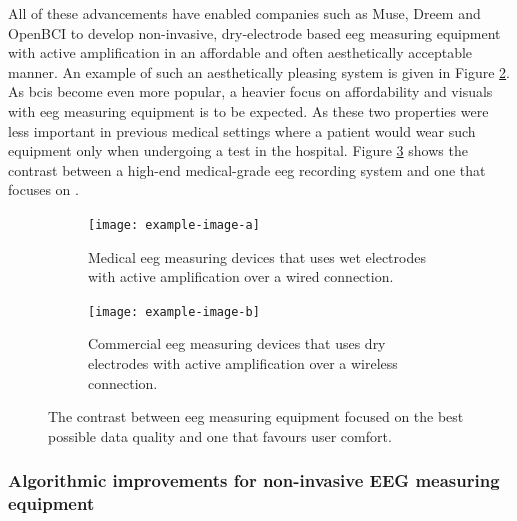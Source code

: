 All of these advancements have enabled companies such as Muse, Dreem and OpenBCI to develop non-invasive,  dry-electrode based \gls{eeg} measuring equipment with active amplification in an affordable and often aesthetically acceptable manner.
An example of such an aesthetically pleasing system is given in Figure \ref{fig:example_eeg_measuring_devices_commercial_clean}.
As \glspl{bci} become even more popular, a heavier focus on affordability and visuals with \gls{eeg} measuring equipment is to be expected.
As these two properties were less important in previous medical settings where a patient would wear such equipment only when undergoing a test in the hospital.
Figure \ref{fig:example_eeg_measuring_devices} shows the contrast between a high-end medical-grade \gls{eeg} recording system and one that focuses on .

\begin{figure}[ht]
  \begin{minipage}{\textwidth}
    \centering
    \begin{subfigure}{.48\textwidth}
        \centering
        \texttt{[image: example-image-a]}
        \captionsetup{width=0.9\linewidth}
        \captionsetup{justification=centering}
        \caption{Medical \gls{eeg} measuring devices that uses wet electrodes with active amplification over a wired connection.}
        \label{fig:example_eeg_measuring_devices_medical_bulky}
    \end{subfigure}
    \hfill
    \begin{subfigure}{.48\textwidth}
        \centering
        \texttt{[image: example-image-b]}
        \captionsetup{width=0.9\linewidth}
        \captionsetup{justification=centering}
        \caption{Commercial \gls{eeg} measuring devices that uses dry electrodes with active amplification over a wireless connection.}
        \label{fig:example_eeg_measuring_devices_commercial_clean}
    \end{subfigure}
    \captionsetup{width=0.9\linewidth}
    \captionsetup{justification=centering}
    \caption{The contrast between \gls{eeg} measuring equipment focused on the best possible data quality and one that favours user comfort.}
    \label{fig:example_eeg_measuring_devices}
  \end{minipage}  
\end{figure}


\subsubsection{Algorithmic improvements for non-invasive EEG measuring equipment}
\label{subsubsec:bci_gaining_popularity_better_measuring_software}

